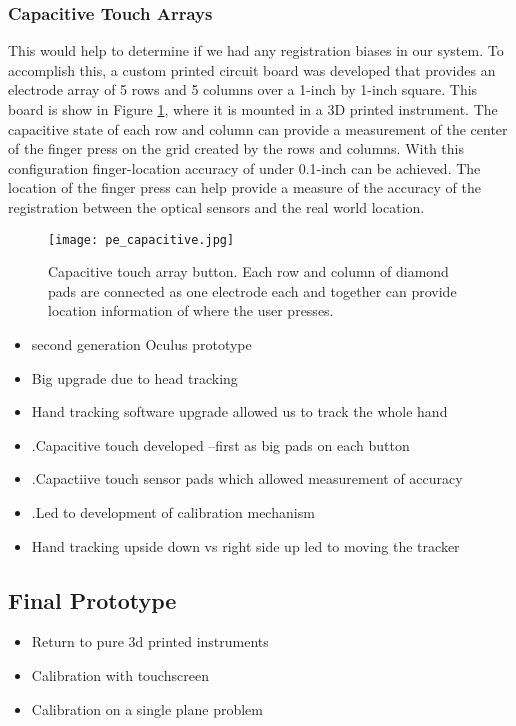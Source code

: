 \subsubsection{Capacitive Touch Arrays}

This would help to determine if we had any registration biases in our system.
To accomplish this, a custom printed circuit board was developed that provides an electrode array of 5 rows and 5 columns over a 1-inch by 1-inch square.
This board is show in Figure \ref{fig:pe_capacitive}, where it is mounted in a 3D printed instrument.
The capacitive state of each row and column can provide a measurement of the center of the finger press on the grid created by the rows and columns.
With this configuration finger-location accuracy of under 0.1-inch can be achieved.
The location of the finger press can help provide a measure of the accuracy of the registration between the optical sensors and the real world location.

\begin{figure}
    \centering
    \texttt{[image: pe\_capacitive.jpg]}
    \caption{Capacitive touch array button. Each row and column of diamond pads are connected as one electrode each and together can provide location information of where the user presses.}
    \label{fig:pe_capacitive}
\end{figure}

\begin{itemize}
    \item second generation Oculus prototype
    \item Big upgrade due to head tracking
    \item Hand tracking software upgrade allowed us to track the whole hand
    \item .Capacitive touch developed --first as big pads on each button
    \item .Capactiive touch sensor pads which allowed measurement of accuracy
    \item .Led to development of calibration mechanism
    \item Hand tracking upside down vs right side up led to moving the tracker
\end{itemize}

\subsection{Final Prototype}

\begin{itemize}
    \item Return to pure 3d printed instruments
    \item Calibration with touchscreen
    \item Calibration on a single plane problem
\end{itemize}

